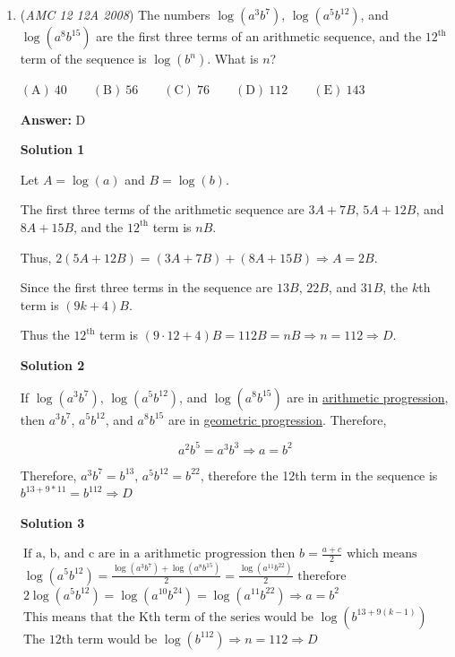 \begin{enumerate}
	\item (\textit{AMC 12 12A 2008}) The numbers $\log(a^3b^7)$, $\log(a^5b^{12})$, and $\log(a^8b^{15})$ are the first three terms of an arithmetic sequence, and the $12^\text{th}$ term of the sequence is $\log(b^n)$. What is $n$?


 $\mathrm{(A)}\ 40\qquad\mathrm{(B)}\ 56\qquad\mathrm{(C)}\ 76\qquad\mathrm{(D)}\ 112\qquad\mathrm{(E)}\ 143$

 \textbf{Answer: }D



\textbf{Solution 1}

Let $A = \log(a)$ and $B = \log(b)$. 

 The first three terms of the arithmetic sequence are $3A + 7B$, $5A + 12B$, and $8A + 15B$, and the $12^\text{th}$ term is $nB$. 

 Thus, $2(5A + 12B) = (3A + 7B) + (8A + 15B) \Rightarrow A = 2B$. 

 Since the first three terms in the sequence are $13B$, $22B$, and $31B$, the $k$th term is $(9k + 4)B$.

 Thus the $12^\text{th}$ term is $(9\cdot12 + 4)B = 112B = nB \Rightarrow n = 112\Rightarrow \boxed{D}$.

 



\textbf{Solution 2}

If $\log(a^3b^7)$, $\log(a^5b^{12})$, and $\log(a^8b^{15})$ are in \href{https://artofproblemsolving.com/wiki/index.php?title=Arithmetic\_progression}{arithmetic progression}, then $a^3b^7$, $a^5b^{12}$, and $a^8b^{15}$ are in \href{https://artofproblemsolving.com/wiki/index.php?title=Geometric\_progression}{geometric progression}. Therefore,

 
 \[a^2b^5=a^3b^3 \Rightarrow a=b^2\]

 Therefore, $a^3b^7=b^{13}$, $a^5b^{12}=b^{22}$, therefore the 12th term in the sequence is $b^{13+9*11}=b^{112} \Rightarrow \boxed{D}$




\textbf{Solution 3}

$\ \text{If a, b, and c are in a arithmetic progression then } b = \frac{a+c}{2} \text{ which means}$$\ \log(a^5b^{12}) = \frac{\log(a^3b^7) + \log(a^8b^{15})}{2}= \frac{\log(a^{11}b^{22})}{2} \text{ therefore}$$\ 2\log(a^5b^{12}) = \log(a^{10}b^{24}) = \log(a^{11}b^{22}) \Rightarrow a=b^2$$\ \text{This means that the Kth term of the series would be } \log(b^{13+9(k-1)})$$\ \text{The 12th term would be } \log(b^{112})  \Rightarrow n=112  \Rightarrow D$





\end{enumerate}
